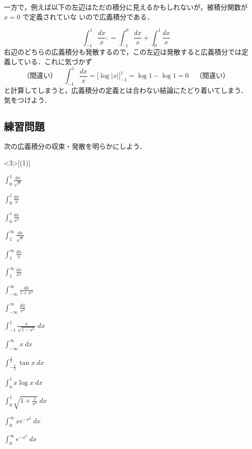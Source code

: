 \documentclass[10pt, uplatex, dvipdfmx]{jsarticle}
\theoremstyle{definition}
\numberwithin{equation}{section}
\newcommand{\ds}{\displaystyle}
\begin{document}
一方で，例えば以下の左辺はただの積分に見えるかもしれないが，被積分関数が $x=0$ で定義されていな
いので広義積分である．

\[
  \int_{-1}^{1} \frac{dx}{x} : = \int_{-1}^{0} \frac{dx}{x} + \int_{0}^{1} \frac{dx}{x}
\]
右辺のどちらの広義積分も発散するので，この左辺は発散すると広義積分では定義している．これに気づかず
\[
  \textbf{（間違い）} \quad \int_{-1}^{1} \frac{dx}{x} = \Big[ \log|x| \Big]_{-1}^{1} = \log 1 - \log 1 =0 \quad
  \textbf{（間違い）}
\]
と計算してしまうと，広義積分の定義とは合わない結論にたどり着いてしまう．気をつけよう．

\newpage

\subsection{練習問題}

次の広義積分の収束・発散を明らかにしよう．

\vspace{1zh}

\begin{edaenumerate}<3>[(1)]

  
\item $\ds \int_{0}^{1} \frac{dx}{\sqrt{x}}$
  
\item $\ds \int_{0}^{1} \frac{dx}{x}$

\item $\ds \int_{0}^{1} \frac{dx}{x^2}$

\item $\ds \int_{1}^{\infty} \frac{dx}{\sqrt{x}}$

\item $\ds \int_{1}^{\infty} \frac{dx}{x}$

\item $\ds \int_{1}^{\infty} \frac{dx}{x^2}$

\item $\ds \int_{-\infty}^{\infty} \frac{dx}{1+x^2}$

\item $\ds \int_{-\infty}^{\infty} \frac{dx}{x^2}$

\item $\ds \int_{-1}^{1} \frac{x}{\sqrt{1-x^2}}\ dx$

\item $\ds \int_{-\infty}^{\infty} x \ dx$

\item $\ds \int_{-\frac{\pi}{2}}^{\frac{\pi}{2}}\tan x\ dx$

\item $\ds \int_{0}^{1} x \log x\ dx$

\item $\ds \int_{0}^{1} \sqrt{1+\frac{1}{x^4}}\ dx$

\item $\ds \int_{0}^{\infty} x e^{-x^2}\ dx$

\item $\ds \int_{0}^{\infty} e^{-x^2}\ dx$

\end{edaenumerate}
\end{document}

